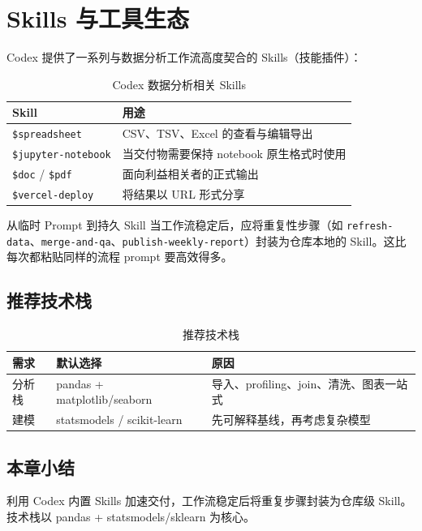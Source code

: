 \section{Skills 与工具生态}

Codex 提供了一系列与数据分析工作流高度契合的 Skills（技能插件）：

\begin{table}[H]
\centering
\begin{tabular}{lp{9cm}}
\toprule
\textbf{Skill} & \textbf{用途} \\
\midrule
\texttt{\$spreadsheet} & CSV、TSV、Excel 的查看与编辑导出 \\
\texttt{\$jupyter-notebook} & 当交付物需要保持 notebook 原生格式时使用 \\
\texttt{\$doc} / \texttt{\$pdf} & 面向利益相关者的正式输出 \\
\texttt{\$vercel-deploy} & 将结果以 URL 形式分享 \\
\bottomrule
\end{tabular}
\caption{Codex 数据分析相关 Skills}
\end{table}

\begin{knowledgebox}{从临时 Prompt 到持久 Skill}
当工作流稳定后，应将重复性步骤（如 \texttt{refresh-data}、\texttt{merge-and-qa}、\texttt{publish-weekly-report}）封装为仓库本地的 Skill。这比每次都粘贴同样的流程 prompt 要高效得多。
\end{knowledgebox}

\subsection{推荐技术栈}

\begin{table}[H]
\centering
\begin{tabular}{lll}
\toprule
\textbf{需求} & \textbf{默认选择} & \textbf{原因} \\
\midrule
分析栈 & pandas + matplotlib/seaborn & 导入、profiling、join、清洗、图表一站式 \\
建模 & statsmodels / scikit-learn & 先可解释基线，再考虑复杂模型 \\
\bottomrule
\end{tabular}
\caption{推荐技术栈}
\end{table}

\subsection{本章小结}
利用 Codex 内置 Skills 加速交付，工作流稳定后将重复步骤封装为仓库级 Skill。技术栈以 pandas + statsmodels/sklearn 为核心。

